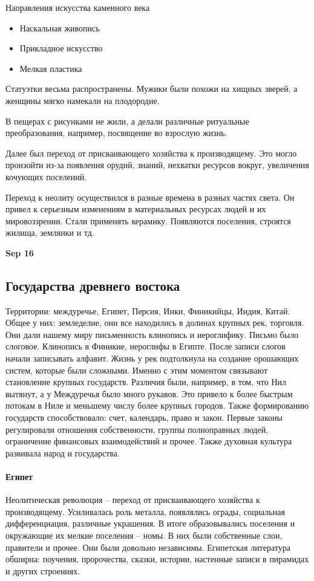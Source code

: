 \documentclass[a4paper, 12pt]{article}
\def\dateis#1{\vspace{\baselineskip}\hfill\textbf{#1}\par}
\begin{document}
\begin{multicols}{2}
Направления искусства каменного века
\begin{itemize}[noitemsep]
\item Наскальная живопись
\item Прикладное искусство
\item Мелкая пластика 
\end{itemize}

Статуэтки весьма распространены. Мужики были похожи на хищных зверей, а женщины мягко намекали на плодородие. 

В пещерах с рисунками не жили, а делали различные ритуальные преобразования, например, посвящение во взрослую жизнь. 

Далее был переход от присваивающего хозяйства к производящему. Это могло произойти из-за появления орудий, знаний, нехватки ресурсов вокруг, увеличения кочующих поселений. 

Переход к неолиту осуществился в разные времена в разных частях света. Он привел к серьезным изменениям в материальных ресурсах людей и их мировоззрении. Стали применять керамику. Появляются поселения, строятся жилища, землянки и тд. 

\dateis{Sep 16}

\subsection{Государства древнего востока} Территории: междуречье, Египет, Персия, Инки, Финикийцы, Индия, Китай. Общее у них: земледелие, они все находились в долинах крупных рек, торговля. Они дали нашему миру письменность клинопись и иероглифику. Письмо было слоговое. Клинопись в Финикие, иероглифы в Египте. После записи слогов начали записывать алфавит. Жизнь у рек подтолкнула на создание орошающих систем, которые были сложными. Именно с этим моментом связывают становление крупных государств. Различия были, например, в  том, что Нил вытянут, а у Междуречья было много рукавов. Это привело к более быстрым потокам в Ниле и меньшему числу более крупных городов. Также формированию государств способствовало: счет, календарь, право и закон. Первые законы регулировали отношения собственности, группы полноправных людей, ограничение финансовых взаимодействий и прочее. Также духовная культура развивала народ и государства. 

\paragraph{Египет} Неолитическая революция -- переход от присваивающего хозяйства к производящему. Усиливалась роль металла, появлялись ограды, социальная дифференциация, различные украшения. В итоге образовывались поселения и окружающие их мелкие поселения -- номы. В них были собственные слои, правители и прочее. Они были довольно независимы. Египетская литература обширна: поучения, пророчества, сказки, истории, настенные записи в пирамидах и других строениях. 


\end{multicols}
\end{document}
